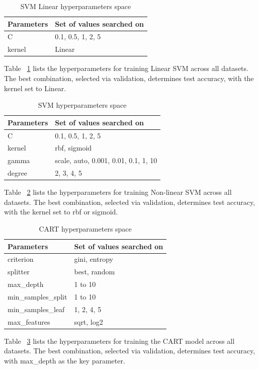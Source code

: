 \documentclass{article} %
\renewcommand{\>}{{\rightarrow}}
\renewcommand{\=}{\stackrel{\triangle}{=}}
\newcommand{\0}{{\mathbf 0}}
\begin{document}
\begin{table}[htbp]
\caption{SVM Linear hyperparameters space}
\label{svl-hyp}
\begin{center}
\begin{tabular}{|p{4cm}|p{8cm}|}
\hline
Parameters &Set of values searched on\\
 \hline
C     &0.1, 0.5, 1, 2, 5\\
kernel   &Linear\\
\hline 
\end{tabular}
\end{center}
\end{table}
Table ~\ref{svl-hyp} lists the hyperparameters for training Linear SVM across all datasets. The best combination, selected via validation, determines test accuracy, with the kernel set to Linear.

\begin{table}[htbp]
\caption{SVM hyperparameters space}
\label{svm-hyp}
\begin{center}
\begin{tabular}{|p{4cm}|p{8cm}|}
\hline
Parameters &Set of values searched on\\
 \hline
C     &0.1, 0.5, 1, 2, 5\\
kernel   & rbf, sigmoid\\
gamma     &scale, auto, 0.001, 0.01, 0.1, 1, 10\\
degree   &2, 3, 4, 5\\
\hline 
\end{tabular}
\end{center}
\end{table}
Table ~\ref{svm-hyp} lists the hyperparameters for training Non-linear SVM across all datasets. The best combination, selected via validation, determines test accuracy, with the kernel set to rbf or sigmoid.

\begin{table}[htbp]
\caption{CART hyperparameters space}
\label{cart-hyp}
\begin{center}
\begin{tabular}{|p{4cm}|p{8cm}|}
\hline
Parameters &Set of values searched on\\
 \hline
criterion &gini, entropy\\
splitter &best, random\\
max\_depth &1 to 10\\
min\_samples\_split &1 to 10\\
min\_samples\_leaf &1, 2, 4, 5\\
max\_features &sqrt, log2\\
\hline 
\end{tabular}
\end{center}
\end{table}
Table ~\ref{cart-hyp} lists the hyperparameters for training the CART model across all datasets. The best combination, selected via validation, determines test accuracy, with max\_depth as the key parameter.
\end{document}
